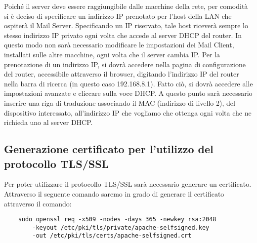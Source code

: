 Poiché il server deve essere raggiungibile dalle macchine della rete, 
per comodità si è deciso di specificare un indirizzo IP prenotato per l’host della LAN che ospiterà il Mail Server. 
Specificando un IP riservato, tale host riceverà sempre lo stesso indirizzo IP privato ogni volta che accede al 
server DHCP del router. In questo modo non sarà necessario modificare le impostazioni dei Mail Client, 
installati sulle altre macchine, ogni volta che il server cambia IP.
Per la prenotazione di un indirizzo IP, si dovrà accedere nella pagina di configurazione del router, 
accessibile attraverso il browser, digitando l’indirizzo IP del router nella barra di ricerca 
(in questo caso 192.168.8.1). Fatto ciò, si dovrà accedere alle impostazioni avanzate e cliccare sulla voce DHCP. 
A questo punto sarà necessario inserire una riga di traduzione associando il MAC (indirizzo di livello 2), 
del dispositivo interessato, all’indirizzo IP che vogliamo che ottenga ogni volta che ne richieda uno al server DHCP.

\begin{table}[htp]
    \centering
    \end{table}

\subsection{Generazione certificato per l'utilizzo del protocollo TLS/SSL}
Per poter utilizzare il protocollo TLS/SSL sarà necessario generare un certificato.
Attraverso il seguente comando saremo in grado di generare il certificato attraverso il comando:

\begin{verbatim}
    sudo openssl req -x509 -nodes -days 365 -newkey rsa:2048 
        -keyout /etc/pki/tls/private/apache-selfsigned.key 
        -out /etc/pki/tls/certs/apache-selfsigned.crt
\end{verbatim}

